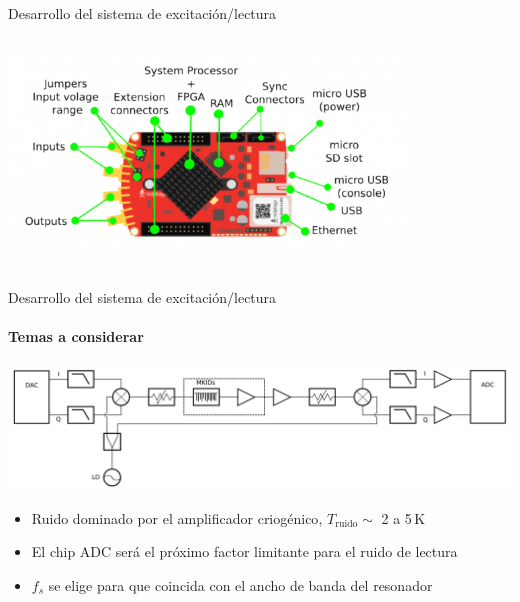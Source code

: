 \documentclass[ignorenonframetext,12pt]{beamer}
\begin{document}
\begin{frame}{Desarrollo del sistema de excitación/lectura}
\begin{columns}
\begin{column}{0.5\textwidth}
												\includegraphics[width=0.8\textwidth]{600px-RedPitaya_HW_overview}
								\end{column}
								\end{columns}
\end{frame}
\begin{frame}{Desarrollo del sistema de excitación/lectura}
				\framesubtitle{Temas a considerar}
				\centering
				\includegraphics[width=\textwidth]{readout1}

				\begin{itemize}
								\item Ruido \alert{dominado por el amplificador criogénico},
												$T_\text{ruido} \sim$ 2 a 5\,K 
								\item \alert{El chip ADC será el próximo factor
												limitante para el ruido de lectura}
								\item	$f_s$ se elige para que
												coincida con el ancho de banda del resonador
				\end{itemize}

\end{frame}
\end{document}
